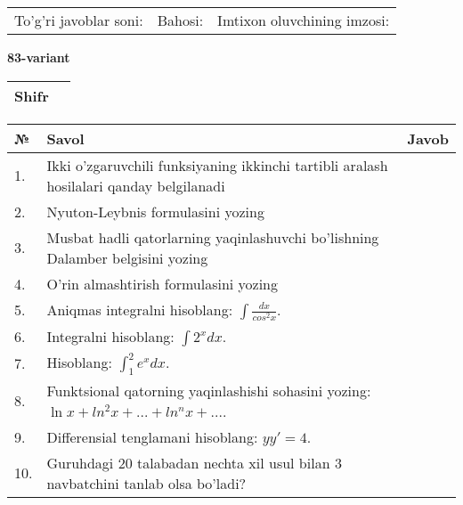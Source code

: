 \documentclass{article}
\begin{document}
  \vspace{1cm}
  
  \begin{tabular}{lll}
  To'g'ri javoblar soni: \underline{\hspace{1.5cm}} & 
  Bahosi: \underline{\hspace{1.5cm}} & 
  Imtixon oluvchining imzosi: \underline{\hspace{2cm}} \\
  \end{tabular}
  
  \egroup
  
  \newpage
  
  
  \textbf{83-variant}\\
  
  \bgroup
  \def\arraystretch{1.6} %
  
  \begin{tabular}{|m{5.7cm}|m{9.5cm}|}
  \hline
  Shifr & \\
  \hline
  \end{tabular}
  
  \vspace{1cm}
  
  \begin{tabular}{|m{0.7cm}|m{10cm}|m{4cm}|}
  \hline
  № & Savol & Javob \\
  \hline
  1. & Ikki o'zgaruvchili funksiyaning ikkinchi tartibli aralash hosilalari qanday belgilanadi &  \\
  \hline
  2. & Nyuton-Leybnis formulasini yozing &  \\
  \hline
  3. & Musbat hadli qatorlarning yaqinlashuvchi bo'lishning Dalamber belgisini yozing &  \\
  \hline
  4. & O'rin almashtirish formulasini yozing &  \\
  \hline
  5. & Aniqmas integralni hisoblang: \(\int \frac{dx}{cos^{2}x}\). &  \\
  \hline
  6. & Integralni hisoblang: \(\int {2^{x}dx}\). &  \\
  \hline
  7. & Hisoblang: \(\int_{1}^{2}{e^{x}dx}\). &  \\
  \hline
  8. & Funktsional qatorning yaqinlashishi sohasini yozing: \(\ln x + ln^{2}x + ... + ln^{n}x + ...\). &  \\
  \hline
  9. & Differensial tenglamani hisoblang: \(yy' = 4\). &  \\
  \hline
  10. & Guruhdagi 20 talabadan nechta xil usul bilan 3 navbatchini tanlab olsa bo'ladi? &  \\
  \hline
  \end{tabular}
  
\end{document}
